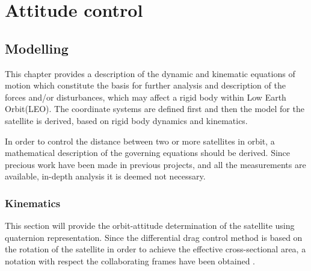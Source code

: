 \part{Attitude control}
\chapter{Modelling}
This chapter provides a description of the dynamic and kinematic equations of motion which constitute the basis for further analysis and description of the forces and/or disturbances, which may affect a rigid body within  Low Earth Orbit(LEO). The coordinate systems are defined first and then the model for the satellite is derived, based on rigid body dynamics and kinematics. 

In order to control the distance between two or more satellites in orbit, a mathematical description of the governing equations should be derived. Since precious work have been made in previous projects, and all the measurements are available, in-depth analysis it is deemed not necessary. 
\section{Kinematics}
This section will provide the orbit-attitude determination of the satellite using quaternion representation. Since the differential drag control method is based on the rotation of the satellite in order to achieve the effective cross-sectional area, a notation with respect the collaborating frames have been obtained .

